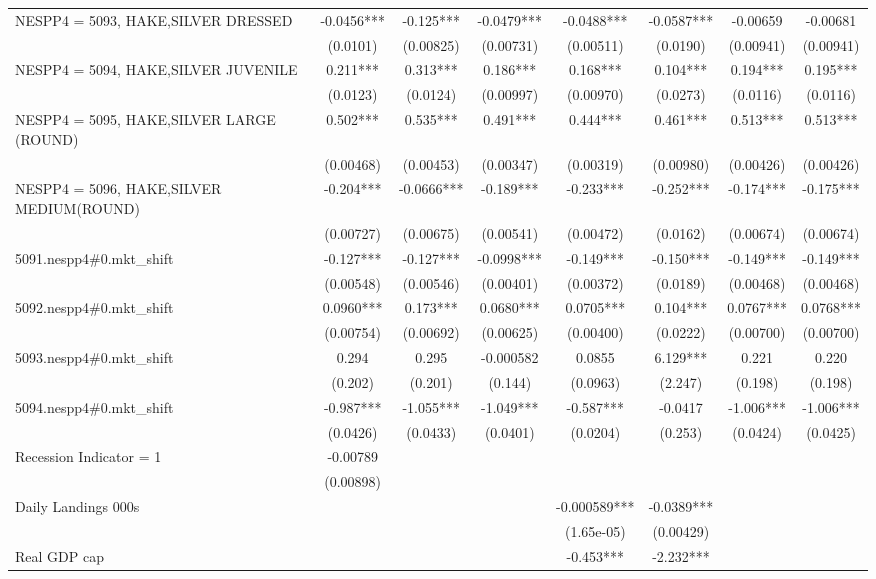 \begin{tabular}{lccccccc}
NESPP4 = 5093, HAKE,SILVER DRESSED & -0.0456*** & -0.125*** & -0.0479*** & -0.0488*** & -0.0587*** & -0.00659 & -0.00681 \\
 & (0.0101) & (0.00825) & (0.00731) & (0.00511) & (0.0190) & (0.00941) & (0.00941) \\
NESPP4 = 5094, HAKE,SILVER JUVENILE & 0.211*** & 0.313*** & 0.186*** & 0.168*** & 0.104*** & 0.194*** & 0.195*** \\
 & (0.0123) & (0.0124) & (0.00997) & (0.00970) & (0.0273) & (0.0116) & (0.0116) \\
NESPP4 = 5095, HAKE,SILVER LARGE (ROUND) & 0.502*** & 0.535*** & 0.491*** & 0.444*** & 0.461*** & 0.513*** & 0.513*** \\
 & (0.00468) & (0.00453) & (0.00347) & (0.00319) & (0.00980) & (0.00426) & (0.00426) \\
NESPP4 = 5096, HAKE,SILVER MEDIUM(ROUND) & -0.204*** & -0.0666*** & -0.189*** & -0.233*** & -0.252*** & -0.174*** & -0.175*** \\
 & (0.00727) & (0.00675) & (0.00541) & (0.00472) & (0.0162) & (0.00674) & (0.00674) \\
5091.nespp4\#0.mkt\_shift & -0.127*** & -0.127*** & -0.0998*** & -0.149*** & -0.150*** & -0.149*** & -0.149*** \\
 & (0.00548) & (0.00546) & (0.00401) & (0.00372) & (0.0189) & (0.00468) & (0.00468) \\
5092.nespp4\#0.mkt\_shift & 0.0960*** & 0.173*** & 0.0680*** & 0.0705*** & 0.104*** & 0.0767*** & 0.0768*** \\
 & (0.00754) & (0.00692) & (0.00625) & (0.00400) & (0.0222) & (0.00700) & (0.00700) \\
5093.nespp4\#0.mkt\_shift & 0.294 & 0.295 & -0.000582 & 0.0855 & 6.129*** & 0.221 & 0.220 \\
 & (0.202) & (0.201) & (0.144) & (0.0963) & (2.247) & (0.198) & (0.198) \\
5094.nespp4\#0.mkt\_shift & -0.987*** & -1.055*** & -1.049*** & -0.587*** & -0.0417 & -1.006*** & -1.006*** \\
 & (0.0426) & (0.0433) & (0.0401) & (0.0204) & (0.253) & (0.0424) & (0.0425) \\
Recession Indicator = 1 & -0.00789 &  &  &  &  &  &  \\
 & (0.00898) &  &  &  &  &  &  \\
Daily Landings 000s &  &  &  & -0.000589*** & -0.0389*** &  &  \\
 &  &  &  & (1.65e-05) & (0.00429) &  &  \\
Real GDP cap &  &  &  & -0.453*** & -2.232*** &  &  \\

\end{tabular}
